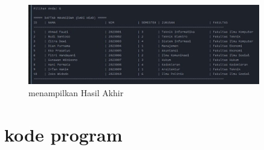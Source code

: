 \documentclass{article}
\begin{document}
\begin{figure}[H]
\centering
\includegraphics[width=0.9\textwidth]{images/gambar9.jpg}
\caption{menampilkan Hasil Akhir}
\label{fig:sample-image}
\end{figure}

\section{kode program}
\end{document}
